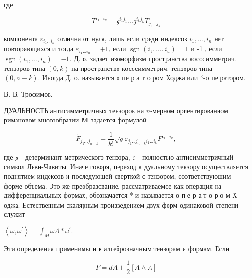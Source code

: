 \documentclass[10pt]{article}
\begin{document}
где



\[

T^{i_{1} \ldots i_{k}}=g^{i_{1} j_{1}} \ldots g^{i_{k} j_{k}} T_{j_{1} \ldots j_{k}}

\]



компонента $\varepsilon_{i_{1} \ldots i_{n}}$ отлична от нуля, лишь если среди индексов $i_{1}, \ldots, i_{n}$ нет повторяющихся и тогда $\varepsilon_{i_{1} \ldots i_{n}}=+1$, если $\operatorname{sgn}\left(i_{1}, \ldots, i_{n}\right)=1$ и -1 , если $\operatorname{sgn}\left(i_{1}, \ldots, i_{n}\right)=-1$. Д. о. задает изоморфизм пространства кососимметрич. тензоров типа $(0, k)$ на пространство кососимметрич. тензоров типа $(0, n-k)$. Иногда Д. о. называется о пе р а т о ром Ходжа или *-о пе ратором.



В. В. Трофимов.



ДУАЛЬНОСТЬ антисимметричных тензоров на $n$-мерном ориентированном римановом многообразии $\boldsymbol{M}$ задается формулой



\[

\tilde{F}_{j_{1} \ldots j_{n-k}}=\frac{1}{k !} \sqrt{g} \varepsilon_{j_{1} \ldots j_{n-k} i_{1} \ldots i_{k}} F^{i_{1} \ldots i_{k}},

\]



где $g$ - детерминант метрического тензора, $\varepsilon$ - полностью антисимметричный символ Леви-Чивиты. Иначе говоря, переход к дуальному тензору осуществляется поднятием индексов и последующей сверткой с тензором, соответствуюшим форме объема. Это же преобразование, рассматриваемое как операция на дифференциальных формах, обозначается * и называется о п е р а т о р о м Х оджа. Естественным скалярным произведением двух форм одинаковой степени служит



$\left\langle\omega, \omega^{\prime}\right\rangle=\int_{M} \omega \Lambda * \omega^{\prime}$.



Эти определения применимы и к алгеброзначным тензорам и формам. Если



\[

F=d A+\frac{1}{2}[A \wedge A]

\]
\end{document}
